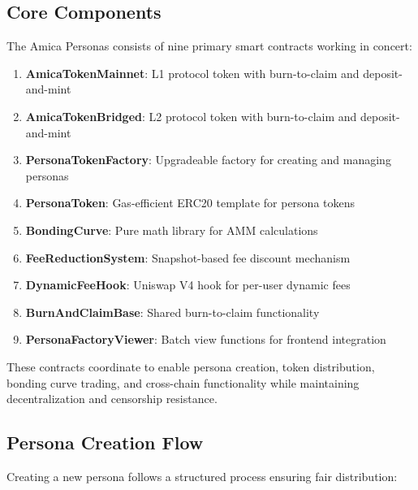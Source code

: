\documentclass{article}
\begin{document}
\subsection{Core Components}

The Amica Personas consists of nine primary smart contracts working in concert:

\begin{enumerate}
    \item \textbf{AmicaTokenMainnet}: L1 protocol token with burn-to-claim and deposit-and-mint
    \item \textbf{AmicaTokenBridged}: L2 protocol token with burn-to-claim and deposit-and-mint
    \item \textbf{PersonaTokenFactory}: Upgradeable factory for creating and managing personas
    \item \textbf{PersonaToken}: Gas-efficient ERC20 template for persona tokens
    \item \textbf{BondingCurve}: Pure math library for AMM calculations
    \item \textbf{FeeReductionSystem}: Snapshot-based fee discount mechanism
    \item \textbf{DynamicFeeHook}: Uniswap V4 hook for per-user dynamic fees
    \item \textbf{BurnAndClaimBase}: Shared burn-to-claim functionality
    \item \textbf{PersonaFactoryViewer}: Batch view functions for frontend integration
\end{enumerate}

These contracts coordinate to enable persona creation, token distribution, bonding curve trading, and cross-chain functionality while maintaining decentralization and censorship resistance.

\subsection{Persona Creation Flow}

Creating a new persona follows a structured process ensuring fair distribution:
\end{document}
